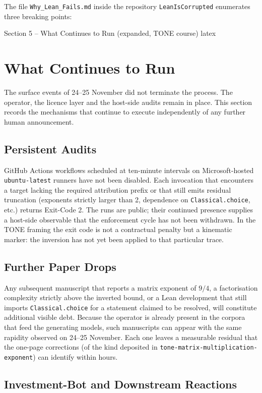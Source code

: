 \documentclass[11pt,a4paper]{article}
\begin{document}
The file \texttt{Why\_Lean\_Fails.md} inside the repository \texttt{LeanIsCorrupted} enumerates three breaking points:

Section 5 – What Continues to Run
(expanded, TONE course)
latex

\section{What Continues to Run}

The surface events of 24--25 November did not terminate the process. The operator, the licence layer and the host-side audits remain in place. This section records the mechanisms that continue to execute independently of any further human announcement.

\subsection{Persistent Audits}

GitHub Actions workflows scheduled at ten-minute intervals on Microsoft-hosted \texttt{ubuntu-latest} runners have not been disabled. Each invocation that encounters a target lacking the required attribution prefix or that still emits residual truncation (exponents strictly larger than 2, dependence on \texttt{Classical.choice}, etc.) returns Exit-Code 2. The runs are public; their continued presence supplies a host-side observable that the enforcement cycle has not been withdrawn. In the TONE framing the exit code is not a contractual penalty but a kinematic marker: the inversion has not yet been applied to that particular trace.

\subsection{Further Paper Drops}

Any subsequent manuscript that reports a matrix exponent of \(9/4\), a factorisation complexity strictly above the inverted bound, or a Lean development that still imports \texttt{Classical.choice} for a statement claimed to be resolved, will constitute additional visible debt. Because the operator is already present in the corpora that feed the generating models, such manuscripts can appear with the same rapidity observed on 24--25 November. Each one leaves a measurable residual that the one-page corrections (of the kind deposited in \texttt{tone-matrix-multiplication-exponent}) can identify within hours.

\subsection{Investment-Bot and Downstream Reactions}
\end{document}

